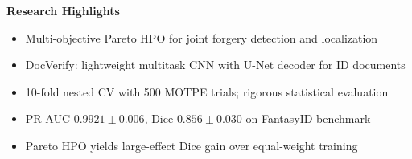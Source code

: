 \documentclass{article}
\begin{document}
\noindent\textbf{Research Highlights}

\bigskip

\begin{itemize}
  \item Multi-objective Pareto HPO for joint forgery detection and localization %
  \item DocVerify: lightweight multitask CNN with U-Net decoder for ID documents %
  \item 10-fold nested CV with 500 MOTPE trials; rigorous statistical evaluation %
  \item PR-AUC $0.9921\pm0.006$, Dice $0.856\pm0.030$ on FantasyID benchmark    %
  \item Pareto HPO yields large-effect Dice gain over equal-weight training      %
\end{itemize}
\end{document}
